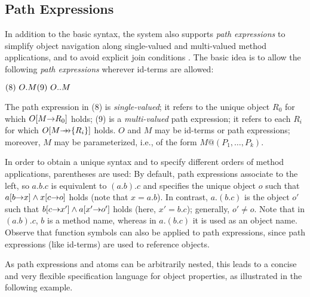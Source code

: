 \documentclass[11pt]{report}
\begin{document}
\subsection{Path Expressions}

In addition to the basic \fl syntax, the \FLORA  system also supports
\emph{path expressions} to simplify object navigation along
single-valued and multi-valued method applications, and to avoid
explicit join conditions \cite{frohn-lausen-uphoff-VLDB-94}.  The
basic idea is to allow the following \emph{path expressions} wherever
id-terms are allowed:

  \medskip

\begin{math}
  \hfill (8)~O.M \hfill (9)~O..M \hfill
\end{math} \medskip

\NI The path expression in (8) is \emph{single-valued}; it refers to
the unique object $R_0$ for which $O[M{\rightarrow} R_0]$ holds; (9) is a
\emph{multi-valued} path expression; it refers to each $R_i$ for which
$O[M{\rightarrow\!\!\!\!\rightarrow}\{R_i\}]$ holds. $O$ and $M$ may be id-terms or path
expressions; moreover, $M$ may be parameterized, i.e., of the form
$M@(P_1,\dots,P_k)$.
  
In order to obtain a unique syntax and to specify different orders of
method applications, parentheses are used: By default, path
expressions associate to the left, so $a.b.c$ is equivalent to
$(a.b).c$ and specifies the unique object $o$ such that $a[b{\rightarrow} x]
\land x[c{\rightarrow} o]$ holds (note that $x=a.b$). In contrast, $a.(b.c)$ is
the object $o'$ such that $b[c{\rightarrow} x'] \land a[x'{\rightarrow} o']$ holds (here,
$x'=b.c$); generally, \ensuremath{o' \neq o}. Note that in $(a.b).c$, $b$ is a
method name, whereas in $a.(b.c)$ it is used as an object name.
Observe that function symbols can also be applied to path
expressions, since path expressions (like id-terms) are used to
reference objects.
  
As path expressions and \fl atoms can be arbitrarily nested, this leads
to a concise and very flexible specification language for object
properties, as illustrated in the following example.
\end{document}
